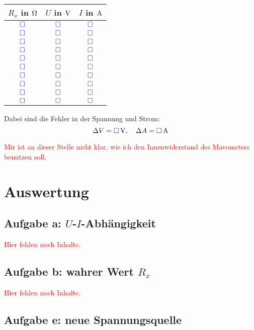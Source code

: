 \documentclass[11pt]{article}
\newcommand{\messwert}{\textcolor{blue}{\square}}
\newcommand{\fehlt}{\textcolor{red}{Hier fehlen noch Inhalte.}}
\begin{document}
\begin{center}
	\begin{tabular}{ccc}
		$R_x$ in $\unit \Omega$ & $U$ in $\unit V$ & $I$ in $\unit A$ \\
		\hline
		$\messwert$ & $\messwert$ & $\messwert$ \\
		$\messwert$ & $\messwert$ & $\messwert$ \\
		$\messwert$ & $\messwert$ & $\messwert$ \\
		$\messwert$ & $\messwert$ & $\messwert$ \\
		$\messwert$ & $\messwert$ & $\messwert$ \\
		$\messwert$ & $\messwert$ & $\messwert$ \\
		$\messwert$ & $\messwert$ & $\messwert$ \\
		$\messwert$ & $\messwert$ & $\messwert$ \\
		$\messwert$ & $\messwert$ & $\messwert$ \\
		$\messwert$ & $\messwert$ & $\messwert$
	\end{tabular}
\end{center}

Dabei sind die Fehler in der Spannung und Strom:
\[ \Delta V = \unit[\messwert]V, \quad \Delta A = \unit[\messwert] A \]

\textcolor{red}{Mir ist an dieser Stelle nicht klar, wie ich den
Innenwiderstand des Mavometers benutzen soll.}


\section{Auswertung}

\subsection{Aufgabe a: $U$-$I$-Abhängigkeit}

\fehlt

\subsection{Aufgabe b: wahrer Wert $R_x$}

\fehlt

\subsection{Aufgabe e: neue Spannungsquelle}
\end{document}
